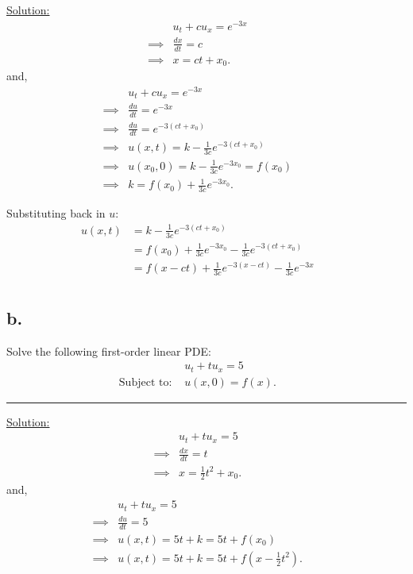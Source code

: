 \documentclass{article}
\begin{document}
\underline{Solution:}
\begin{align*}
  &u_t + c u_x= e^{-3x} &&\\
  \implies& \frac{dx}{dt} = c &&\\
  \implies& x = ct + x_0.
\end{align*}
and,
\begin{align*}
  &u_t + c u_x= e^{-3x} &&\\
  \implies& \frac{du}{dt} = e^{-3x} &&\\
  \implies& \frac{du}{dt} = e^{-3(ct + x_0)} &&\\
  \implies& u(x,t) = k - \frac{1}{3c} e^{-3(ct + x_0)} &&\\
  \implies& u(x_0,0) = k - \frac{1}{3c} e^{-3x_0} = f(x_0) &&\\
  \implies& k = f(x_0) + \frac{1}{3c} e^{-3x_0}.
\end{align*}

Substituting back in $u$:
\begin{align*}
  u(x,t) &= k - \frac{1}{3c} e^{-3(ct + x_0)} &&\\
  &= f(x_0) + \frac{1}{3c} e^{-3x_0} - \frac{1}{3c} e^{-3(ct + x_0)} &&\\
  &= f(x-ct) + \frac{1}{3c} e^{-3(x-ct)} - \frac{1}{3c} e^{-3x} &&\\
\end{align*}

\newpage

\subsection*{b.}
Solve the following first-order linear PDE:
\begin{align*}
  &u_t + t u_x= 5 &&\\
  \text{Subject to: }& u(x,0) = f(x).
\end{align*}

\begin{center}
  \noindent\rule{8cm}{0.4pt}
\end{center}

\underline{Solution:}
\begin{align*}
  &u_t + t u_x= 5 &&\\
  \implies& \frac{dx}{dt} = t &&\\
  \implies& x = \frac{1}{2} t^2 + x_0.
\end{align*}
and,
\begin{align*}
  &u_t + t u_x= 5 &&\\
  \implies& \frac{du}{dt} = 5 &&\\
  \implies& u(x,t) = 5t + k = 5t + f(x_0) &&\\
  \implies& u(x,t) = 5t + k = 5t + f(x-\frac{1}{2} t^2).
\end{align*}
\end{document}
